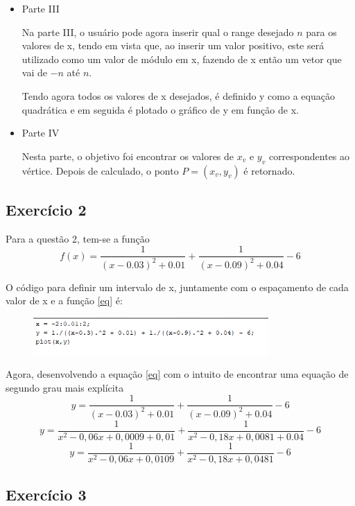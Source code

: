 \documentclass[12pt]{article}
\begin{document}
\begin{itemize}
    \item Parte III
    
    Na parte III, o usuário pode agora inserir qual o range desejado $n$ para os valores de x, tendo em vista que, ao inserir um valor positivo, este será 
    utilizado como um valor de módulo em x, fazendo de x então um vetor que vai de $-n$ até $n$.

    Tendo agora todos os valores de x desejados, é definido y como a equação quadrática e em seguida é plotado o gráfico de y em função de x.

    \item Parte IV
    
    Nesta parte, o objetivo foi encontrar os valores de $x_v$ e $y_v$ correspondentes ao vértice. Depois de calculado, o ponto $P=(x_v, y_v)$ é retornado.
\end{itemize}

\subsection{Exercício 2}

Para a questão 2, tem-se a função 
\begin{equation}
    f(x) = \frac{1}{(x-0.03)^2 + 0.01} + \frac{1}{(x-0.09)^2 + 0.04} - 6
    \label{eq}
\end{equation}

O código para definir um intervalo de x, juntamente com o espaçamento de cada valor de x e a função \ref{eq} é:
\begin{figure}[H]
    \begin{center}
        \includegraphics[width=0.8\textwidth]{questao2.png}
    \end{center}
\end{figure}

Agora, desenvolvendo a equação \ref{eq} com o intuito de encontrar uma equação de segundo grau mais explícita
\[ y = \frac{1}{(x-0.03)^2 + 0.01} + \frac{1}{(x-0.09)^2 + 0.04} - 6\] 
\[ y = \frac{1}{x^2 - 0,06x + 0,0009 + 0,01} + \frac{1}{x^2 - 0,18x + 0,0081 + 0.04} - 6\] 
\[ y = \frac{1}{x^2 - 0,06x + 0,0109} + \frac{1}{x^2 - 0,18x + 0,0481} - 6\]



\subsection{Exercício 3}
\end{document}
